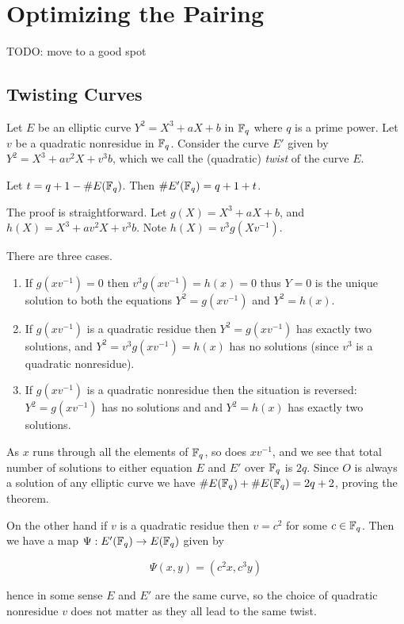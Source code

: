 \chapter{Optimizing the Pairing}

TODO: move to a good spot
\section {Twisting Curves}

Let $E$ be an elliptic curve $Y^2 = X^3 + a X + b$ in $\mathbb{F}_q$ where
$q$ is a prime power.
Let $v$ be a quadratic nonresidue in $\mathbb{F}_q$.
Consider
the curve $E'$ given by $Y^2 = X^3 + a v^2 X + v^3 b$,
which we call the (quadratic) \emph{twist} of the curve $E$.

\begin{theorem}
Let $t = q + 1 - \#E(\mathbb{F}_q)$. Then $\#E'(\mathbb{F}_q) = q + 1 + t$.
\end{theorem}

The proof is straightforward.
Let $g(X) = X^3 + a X + b$, and $h(X) = X^3 + a v^2 X + v^3 b$.
Note $h(X) = v^3 g(Xv^{-1})$.

There are three cases.

\begin{enumerate}
\item
If $g(xv^{-1}) = 0$ then $v^3g(xv^{-1}) = h(x) = 0$ thus
$Y = 0$ is the unique solution to both the
equations $Y^2 = g(xv^{-1})$ and $Y^2 = h(x)$.
\item
If $g(xv^{-1})$ is a quadratic residue then $Y^2 = g(xv^{-1})$
has exactly two solutions,
and $Y^2 = v^3 g(xv^{-1}) = h(x)$ has no solutions (since $v^3$
is a quadratic nonresidue).
\item
If $g(xv^{-1})$ is a quadratic nonresidue then the situation is reversed:
$Y^2 = g(xv^{-1})$ has no solutions and
and $Y^2 = h(x)$ has exactly two solutions.
\end{enumerate}

As $x$ runs through all the elements of $\mathbb{F}_q$, so does $xv^{-1}$,
and we see that total number of solutions to either equation $E$ and $E'$
over $\mathbb{F}_q$ is $2q$.
Since $O$ is always a solution of any elliptic curve we have
$\#E(\mathbb{F}_q) + \#E(\mathbb{F}_q) = 2q + 2$, proving the theorem.

On the other hand if $v$ is a quadratic residue then $v = c^2$ for some
$c \in \mathbb{F}_q$. Then we have a map $\Psi : E'(\mathbb{F}_q) \rightarrow E(\mathbb{F}_q)$
given by

\[ \Psi(x,y) = (c^2 x,c^3 y) \]

hence in some sense $E$ and $E'$ are the same curve, so the choice of
quadratic nonresidue $v$ does not matter as they all lead to the same twist.

